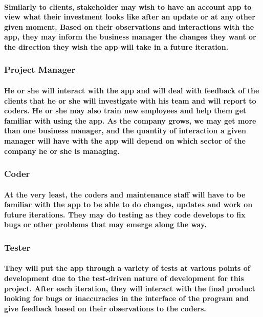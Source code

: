 \documentclass{article}
\begin{document}
\paragraph{\indent Similarly to clients, stakeholder may wish to have an account app to view what their investment looks like after an update or at any other given moment. Based on their observations and interactions with the app, they may inform the business manager the changes they want or the direction they wish the app will take in a future iteration.}

\subsubsection{Project Manager}
\paragraph{\indent He or she will interact with the app and will deal with feedback of the clients that he or she will investigate with his team and will report to coders. He or she may also train new employees and help them get familiar with using the app. As the company grows, we may get more than one business manager, and the quantity of interaction a given manager will have with the app will depend on which sector of the company he or she is managing.}

\subsubsection{Coder}
\paragraph{\indent At the very least, the coders and maintenance staff will have to be familiar with the app to be able to do changes, updates and work on future iterations. They may do testing as they code develops to fix bugs or other problems that may emerge along the way.}

\subsubsection{Tester}
\paragraph{\indent They will put the app through a variety of tests at various points of development due to the test-driven nature of development for this project. After each iteration, they will interact with the final product looking for bugs or inaccuracies in the interface of the program and give feedback based on their observations to the coders.}
\end{document}
